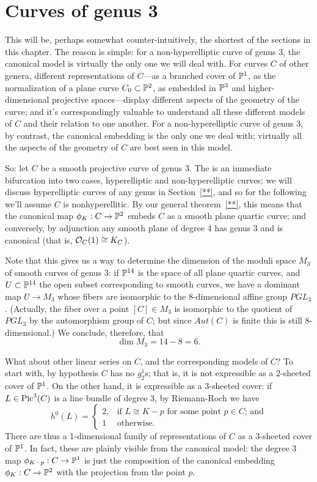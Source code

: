 \section{Curves of genus 3}

This will be, perhaps somewhat counter-intuitively, the shortest of the sections in this chapter. The reason is simple: for a non-hyperelliptic curve of genus 3, the canonical model is virtually the only one we will deal with. For curves $C$ of other genera, different representations of $C$---as a branched cover of $\PP^1$, as the normalization of a plane curve $C_0 \subset \PP^2$, as embedded in $\PP^3$ and higher-dimensional projective spaces---display different aspects of the geometry of the curve; and it's correspondingly valuable to understand all these different models of $C$ and their relation to one another. For a non-hyperelliptic curve of genus 3, by contrast, the canonical embedding is  the only one we deal with; virtually all the aspects of the geometry of $C$ are best seen in this model.

So: let $C$ be a smooth projective curve of genus 3. The is an immediate bifurcation into two cases, hyperelliptic and non-hyperelliptic curves; we will discuss hyperelliptic curves of any genus in Section~\ref{**}, and so for the following we'll assume $C$ is nonhyperellitic. By our general theorem~\ref{**}, this means that the canonical map $\phi_K : C \to \PP^2$ embeds $C$ as a smooth plane quartic curve; and conversely, by adjunction any smooth plane of degree 4 has genus 3 and is canonical (that is, $\cO_C(1) \cong K_C$).

Note that this gives us a way to determine the dimension of the moduli space $M_3$ of smooth curves of genus $3$: if $\PP^{14}$ is the space of all plane quartic curves, and $U \subset \PP^{14}$ the open subset corresponding to smooth curves, we have a dominant map $U \to M_3$ whose fibers are isomorphic to the 8-dimensional affine group $PGL_3$. (Actually, the fiber over a point $[C] \in M_3$ is isomorphic to the quotient of $PGL_3$ by the automorphism group of $C$; but since $Aut(C)$ is finite this is still 8-dimensional.) We conclude, therefore, that
$$
\dim M_3 = 14 - 8 = 6.
$$

What about other linear series on $C$, and the corresponding models of $C$? To start with, by hypothesis $C$ has no $g^1_2$s; that is, it is not expressible as a 2-sheeted cover of $\PP^1$. On the other hand, it is expressible as a 3-sheeted cover: if $L \in \pic^3(C)$ is a line bundle of degree 3, by Riemann-Roch we have
$$
h^0(L) = 
\begin{cases}
2, &\text{if $L \cong K-p$ for some point $p \in C$; and} \\
1 &\text{otherwise.}
\end{cases}
$$
There are thus a 1-dimensional family of representations of $C$ as a 3-sheeted cover of $\PP^1$. In fact, these are plainly visible from the canonical model: the degree 3 map $\phi_{K-p} : C \to \PP^1$ is just the composition of the canonical embedding $\phi_K : C \to \PP^2$ with the projection from the point $p$.


